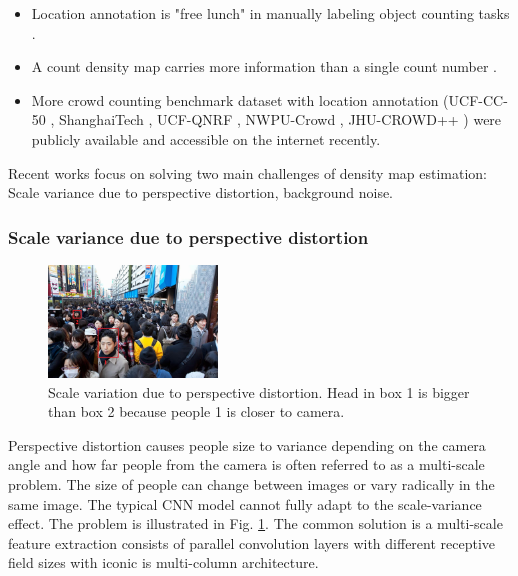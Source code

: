 \begin{itemize}
    \item Location annotation is "free lunch" in manually labeling object counting tasks \cite{lempitsky2010learning}.
    \item A count density map carries more information than a single count number \cite{zhang2016single}.
    \item More crowd counting benchmark dataset with location annotation (UCF-CC-50 \cite{idrees2013multi}, ShanghaiTech \cite{zhang2016single}, UCF-QNRF \cite{idrees2018composition}, NWPU-Crowd \cite{gao2020nwpu}, JHU-CROWD++ \cite{sindagi2020jhucrowd}) 
were publicly available and accessible on the internet recently.
\end{itemize}

Recent works focus on solving two main challenges of density map estimation: Scale variance due to perspective distortion, background noise.

\subsubsection{Scale variance due to perspective distortion} \hfill

\begin{figure}[htbp]
\centerline{\includegraphics[width=0.4\textwidth]{Picture/problem/part_a_train_IMG_44-annotate-scale.jpg}}
\caption{Scale variation due to perspective distortion. Head in box 1 is bigger than box 2 because people 1 is closer to camera.}
\label{fig:scale}
\end{figure}

Perspective distortion causes people size to variance depending on the camera angle and how far people from the camera is often referred to as a multi-scale problem. The size of people can change between images or vary radically in the same image. The typical CNN model cannot fully adapt to the scale-variance effect. The problem is illustrated in Fig. \ref{fig:scale}. The common solution is a multi-scale feature extraction consists of parallel convolution layers with different receptive field sizes with iconic is multi-column architecture.

